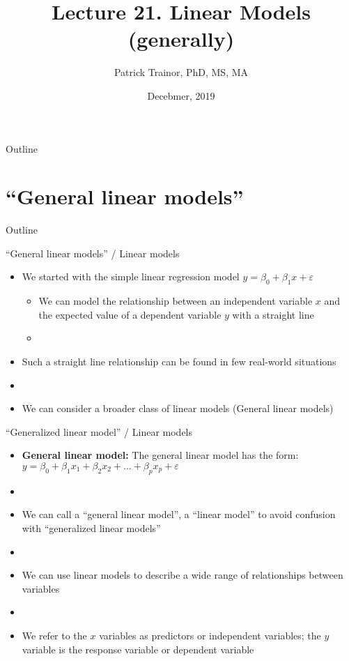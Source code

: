 \documentclass[xcolor=dvipsnames]{beamer}
\title[Lecture 21]{Lecture 21. Linear Models (generally)}
\author[Patrick Trainor]{Patrick Trainor, PhD, MS, MA}
\institute[NMSU]{New Mexico State University}
\date{Decebmer, 2019}
\begin{document}
\begin{frame}
\maketitle
\end{frame}

\begin{frame}{Outline}
\tableofcontents[hideallsubsections]
\end{frame}

\section{``General linear models''}
\begin{frame}{Outline}
	\tableofcontents[currentsection,subsectionstyle=show/shaded/hide]
\end{frame}

\begin{frame}{``General linear models'' / Linear models}
	\begin{itemize}
		\item We started with the simple linear regression model $y = \beta_0 + \beta_1 x + \varepsilon$
		\begin{itemize}
			\item We can model the relationship between an independent variable $x$ and the expected value of a dependent variable $y$ with a straight line
			\item[]
		\end{itemize}
		\item Such a straight line relationship can be found in few real-world situations
		\item[]
		\item We can consider a broader class of linear models (General linear models)
	\end{itemize}
\end{frame}

\begin{frame}{``Generalized linear model'' / Linear models}
	\begin{itemize}
		\item \textbf{General linear model:} The general linear model has the form: $y = \beta_0 + \beta_1 x_1 + \beta_2 x_2 + \hdots + \beta_p x_p + \varepsilon$
		\item[]
		\item We can call a ``general linear model'', a ``linear model'' to avoid confusion with ``generalized linear models''
		\item[]
		\item We can use linear models to describe a wide range of relationships between variables
		\item[]
		\item We refer to the $x$ variables as predictors or independent variables; the $y$ variable is the response variable or dependent variable
	\end{itemize}
\end{frame}
\end{document}
